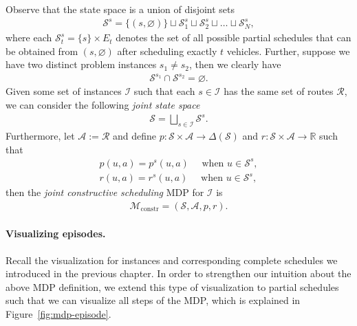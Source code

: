\documentclass[a4paper]{report}
\theoremstyle{definition}
\theoremstyle{plain}
\begin{document}
Observe that the state space is a union of disjoint sets
\begin{align}
  \label{eq:8}
  \mathcal{S}^s = \{(s, \varnothing)\} \sqcup \mathcal{S}_1^s \sqcup \mathcal{S}_2^s \sqcup \dots \sqcup \mathcal{S}_N^s ,
\end{align}
where each $\mathcal{S}_t^s = \{s\} \times E_t$ denotes the set of all possible
partial schedules that can be obtained from $(s, \varnothing)$ after scheduling
exactly $t$ vehicles.
%
Further, suppose we have two distinct problem instances $s_1 \neq s_2$, then we
clearly have
\begin{align}
  \mathcal{S}^{s_1} \cap \mathcal{S}^{s_2} = \varnothing .
\end{align}
%
Given some set of instances $\mathcal{I}$ such that each $s \in \mathcal{I}$ has
the same set of routes $\mathcal{R}$, we can consider the following \emph{joint state space}
\begin{align}
  \mathcal{S} = \bigsqcup_{s \in \mathcal{I}} \mathcal{S}^s .
\end{align}
Furthermore, let $\mathcal{A} := \mathcal{R}$ and define
$p : \mathcal{S} \times \mathcal{A} \rightarrow \Delta(\mathcal{S})$ and
$r : \mathcal{S} \times \mathcal{A} \rightarrow \mathbb{R}$ such that
\begin{align*}
  p(u, a) = p^s(u, a) \quad \text{ when } u \in \mathcal{S}^s , \\
  r(u, a) = r^s(u, a) \quad \text{ when } u \in \mathcal{S}^s ,
\end{align*}
%
then the \emph{joint constructive scheduling} MDP for $\mathcal{I}$ is
\begin{align}
  \tag{M}
  \mathcal{M}_\mathrm{constr} = (\mathcal{S}, \mathcal{A}, p, r) .
\end{align}


\paragraph{Visualizing episodes.}

Recall the visualization for instances and corresponding complete schedules we
introduced in the previous chapter. In order to strengthen our intuition about
the above MDP definition, we extend this type of visualization to partial
schedules such that we can visualize all steps of the MDP, which is explained in
Figure~\ref{fig:mdp-episode}.
\end{document}
